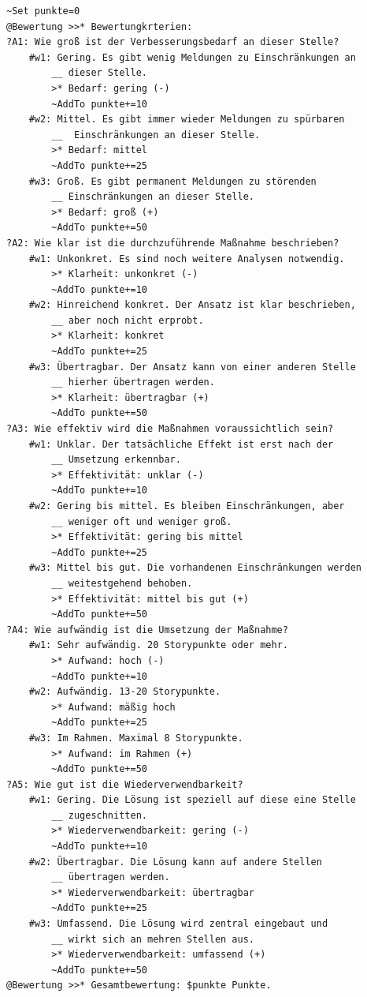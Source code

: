 \label{BspBewertungssystem}
\begin{verbatim}
~Set punkte=0
@Bewertung >>* Bewertungkrterien: 
?A1: Wie groß ist der Verbesserungsbedarf an dieser Stelle?
    #w1: Gering. Es gibt wenig Meldungen zu Einschränkungen an
        __ dieser Stelle.
        >* Bedarf: gering (-)
        ~AddTo punkte+=10
    #w2: Mittel. Es gibt immer wieder Meldungen zu spürbaren 
        __  Einschränkungen an dieser Stelle.
        >* Bedarf: mittel
        ~AddTo punkte+=25
    #w3: Groß. Es gibt permanent Meldungen zu störenden
        __ Einschränkungen an dieser Stelle.
        >* Bedarf: groß (+)
        ~AddTo punkte+=50
?A2: Wie klar ist die durchzuführende Maßnahme beschrieben?
    #w1: Unkonkret. Es sind noch weitere Analysen notwendig.
        >* Klarheit: unkonkret (-)
        ~AddTo punkte+=10
    #w2: Hinreichend konkret. Der Ansatz ist klar beschrieben,
        __ aber noch nicht erprobt.
        >* Klarheit: konkret
        ~AddTo punkte+=25
    #w3: Übertragbar. Der Ansatz kann von einer anderen Stelle
        __ hierher übertragen werden.
        >* Klarheit: übertragbar (+)
        ~AddTo punkte+=50
?A3: Wie effektiv wird die Maßnahmen voraussichtlich sein?
    #w1: Unklar. Der tatsächliche Effekt ist erst nach der
        __ Umsetzung erkennbar.
        >* Effektivität: unklar (-)
        ~AddTo punkte+=10
    #w2: Gering bis mittel. Es bleiben Einschränkungen, aber
        __ weniger oft und weniger groß.
        >* Effektivität: gering bis mittel
        ~AddTo punkte+=25
    #w3: Mittel bis gut. Die vorhandenen Einschränkungen werden
        __ weitestgehend behoben.
        >* Effektivität: mittel bis gut (+)
        ~AddTo punkte+=50
?A4: Wie aufwändig ist die Umsetzung der Maßnahme?
    #w1: Sehr aufwändig. 20 Storypunkte oder mehr.
        >* Aufwand: hoch (-)
        ~AddTo punkte+=10
    #w2: Aufwändig. 13-20 Storypunkte.
        >* Aufwand: mäßig hoch
        ~AddTo punkte+=25
    #w3: Im Rahmen. Maximal 8 Storypunkte.
        >* Aufwand: im Rahmen (+)
        ~AddTo punkte+=50
?A5: Wie gut ist die Wiederverwendbarkeit?
    #w1: Gering. Die Lösung ist speziell auf diese eine Stelle
        __ zugeschnitten.
        >* Wiederverwendbarkeit: gering (-)
        ~AddTo punkte+=10
    #w2: Übertragbar. Die Lösung kann auf andere Stellen
        __ übertragen werden.
        >* Wiederverwendbarkeit: übertragbar
        ~AddTo punkte+=25
    #w3: Umfassend. Die Lösung wird zentral eingebaut und
        __ wirkt sich an mehren Stellen aus.
        >* Wiederverwendbarkeit: umfassend (+)
        ~AddTo punkte+=50
@Bewertung >>* Gesamtbewertung: $punkte Punkte.
\end{verbatim}

